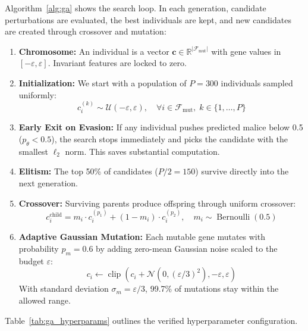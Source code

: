\documentclass[final,5p,times,twocolumn]{elsarticle}
\begin{document}
Algorithm~\ref{alg:ga} shows the search loop. In each generation, candidate perturbations are evaluated, the best individuals are kept, and new candidates are created through crossover and mutation:
\begin{enumerate}
    \item \textbf{Chromosome:} An individual is a vector $\mathbf{c} \in \mathbb{R}^{|\mathcal{F}_{\text{mut}}|}$ with gene values in $[-\varepsilon, \varepsilon]$. Invariant features are locked to zero.
    \item \textbf{Initialization:} We start with a population of $P=300$ individuals sampled uniformly:
    \begin{equation}
        c^{(k)}_i \sim \mathcal{U}(-\varepsilon, \varepsilon), \quad \forall i \in \mathcal{F}_{\text{mut}}, \; k \in \{1, \dots, P\}
    \end{equation}
    \item \textbf{Early Exit on Evasion:} If any individual pushes predicted malice below 0.5 ($p_\theta < 0.5$), the search stops immediately and picks the candidate with the smallest $\ell_2$ norm. This saves substantial computation.
    \item \textbf{Elitism:} The top 50\% of candidates ($P/2 = 150$) survive directly into the next generation.
    \item \textbf{Crossover:} Surviving parents produce offspring through uniform crossover:
    \begin{equation}
        c^{\text{child}}_i = m_i \cdot c^{(p_1)}_i + (1 - m_i) \cdot c^{(p_2)}_i, \quad m_i \sim \operatorname{Bernoulli}(0.5)
    \end{equation}
    \item \textbf{Adaptive Gaussian Mutation:} Each mutable gene mutates with probability $p_m = 0.6$ by adding zero-mean Gaussian noise scaled to the budget $\varepsilon$:
    \begin{equation}
        c_i \leftarrow \operatorname{clip}\left(c_i + \mathcal{N}\left(0, (\varepsilon/3)^2\right), -\varepsilon, \varepsilon\right)
    \end{equation}
    With standard deviation $\sigma_m = \varepsilon/3$, 99.7\% of mutations stay within the allowed range.
\end{enumerate}

Table~\ref{tab:ga_hyperparams} outlines the verified hyperparameter configuration.
\end{document}
